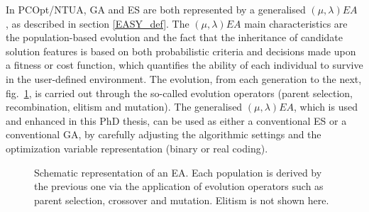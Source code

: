 In PCOpt/NTUA, GA and ES are both represented by a generalised $(\mu,\lambda)EA$ \cite{phd_Giotis,phd_Karakasis,phd_Kampolis}, as described in section \ref{EASY_def}.  The $(\mu,\lambda)EA$ main characteristics are the population-based evolution and the fact that the inheritance of candidate solution features is based on both probabilistic criteria and decisions made upon a fitness or cost function, which quantifies the ability of each individual to survive in the user-defined environment. The evolution, from each generation to the next, fig.\ \ref{EA}, is carried out through the so-called evolution operators (parent selection, recombination, elitism and mutation). The generalised $(\mu,\lambda)EA$, which is used and enhanced in this PhD thesis, can be used as either a conventional ES or a conventional GA, by carefully adjusting the algorithmic settings and the optimization variable representation (binary or real coding).  

\begin{figure}[h!]
\begin{minipage}[b]{1\linewidth}
 \centering
\end{minipage}
\caption{Schematic representation of an EA. Each population is derived by the previous one via the application of evolution operators such as parent selection, crossover and mutation. Elitism is not shown here. } 
\label{EA}
\end{figure}



